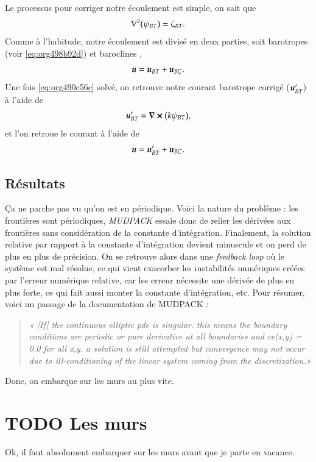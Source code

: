 \documentclass[10pt]{article}
\numberwithin{equation}{section}
\newcommand{\uu}{\vb*{u}}
\begin{document}
Le processus pour corriger notre écoulement est simple, on sait que
\begin{equation}
\label{eq:org490c56c}
   \laplacian(\psi_{BT}) = \zeta_{BT}.
\end{equation}
Comme à l'habitude, notre écoulement est divisé en deux parties, soit barotropes (voir \ref{eq:org498b92d}) et baroclines ,
\begin{equation}
   \uu = \uu_{BT} + \uu_{BC}.
\end{equation}
Une fois \ref{eq:org490c56c} solvé, on retrouve notre courant barotrope corrigé (\(\uu_{BT}'\)) à l'aide de
\begin{equation}
   \uu_{BT}' = \curl(k\psi_{BT}),
\end{equation}
et l'on retroue le courant à l'aide de
\begin{equation}
   \uu = \uu_{BT}' + \uu_{BC}.
\end{equation}


\subsection{Résultats}
\label{sec:orga89f177}
Ça ne parche pas vu qu'on est en périodique.
Voici la nature du problème : les frontières sont périodiques, \emph{MUDPACK} essaie donc de relier les dérivées aux frontières sans considération de la constante d'intégration.
Finalement, la solution relative par rapport à la constante d'intégration devient minuscule et on perd de plus en plus de précision.
On se retrouve alors dans une \emph{feedback loop} où le système est mal résolue, ce qui vient exacerber les instabilités numériques créées par l'erreur numérique relative, car les erreur nécessite une dérivée de plus en plus forte, ce qui fait aussi monter la constante d'intégration, etc.
Pour résumer, voici un passage de la documentation de MUDPACK :

\begin{quote}
\emph{« [If] the continuous elliptic pde is singular.  this means the boundary conditions are periodic or pure derivative at all boundaries and ce(x,y) = 0.0 for all x,y.  a solution is still attempted but convergence may not occur due to ill-conditioning of the linear system coming from the discretization.»}
\end{quote}

Donc, on embarque sur les murs au plus vite.

\section{{\bfseries\sffamily TODO} Les murs}
\label{sec:org3ceb940}
Ok, il faut absolument embarquer sur les murs avant que je parte en vacance.
\end{document}

